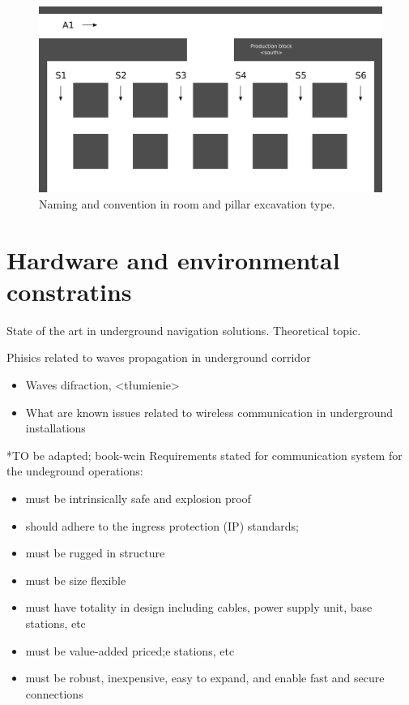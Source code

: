 \documentclass[../main.tex]{subfiles}
\begin{document}
\begin{figure}[ht]
\includegraphics[width=\textwidth]{pictures/room_and_pillar_scheme.pdf}
\centering
\caption{Naming and convention in room and pillar excavation type.}
\label{fig:room_and_pillar_scheme}
\end{figure}



\section{Hardware and environmental constratins} %
\label{sub:hardware_and_environmental_constratins}



State of the art in underground navigation solutions. Theoretical topic.

Phisics related to waves propagation in underground corridor
\begin{itemize}
	\item Waves difraction, <tłumienie>
	\item What are known issues related to wireless communication in underground installations
\end{itemize}



*TO be adapted; book-wcin
Requirements stated for communication system for the undeground operations:
\begin{itemize}
	\item must be intrinsically safe and explosion proof
	\item should adhere to the ingress protection (IP) standards;
	\item must be rugged in structure
	\item must be size flexible
	\item must have totality in design including cables, power supply unit, base stations, etc
	\item must be value-added priced;e stations, etc
	\item must be robust, inexpensive, easy to expand,
and enable fast and secure connections
\end{itemize}
\end{document}
